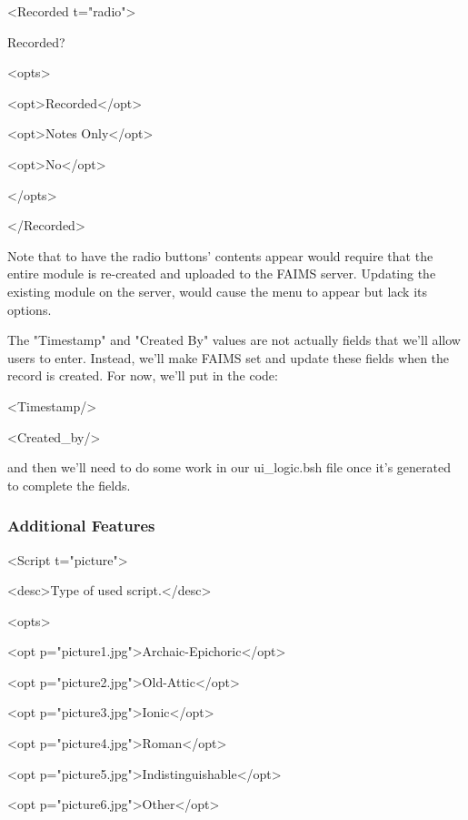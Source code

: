 <Recorded t="radio">

Recorded?

<opts>

<opt>Recorded</opt>

<opt>Notes Only</opt>

<opt>No</opt>

</opts>

</Recorded>

Note that to have the radio buttons' contents appear would require that the entire module is re-created and uploaded to the FAIMS server. Updating the existing module on the server, would cause the menu to appear but lack its options.

{}{}

The "Timestamp" and "Created By" values are not actually fields that we'll allow users to enter. Instead, we'll make FAIMS set and update these fields when the record is created. For now, we'll put in the code:

<Timestamp/>

<Created_by/>

and then we'll need to do some work in our ui_logic.bsh file once it's generated to complete the fields.

{}{}

\subsubsection[additional-features]{Additional Features}


<Script t="picture">

<desc>Type of used script.</desc>

<opts>

<opt p="picture1.jpg">Archaic-Epichoric</opt>

<opt p="picture2.jpg">Old-Attic</opt>

<opt p="picture3.jpg">Ionic</opt>

<opt p="picture4.jpg">Roman</opt>

<opt p="picture5.jpg">Indistinguishable</opt>

<opt p="picture6.jpg">Other</opt>

